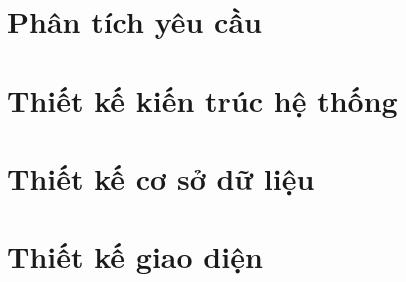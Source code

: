 \section{Phân tích yêu cầu}

\section{Thiết kế kiến trúc hệ thống}

\section{Thiết kế cơ sở dữ liệu}

\section{Thiết kế giao diện}

